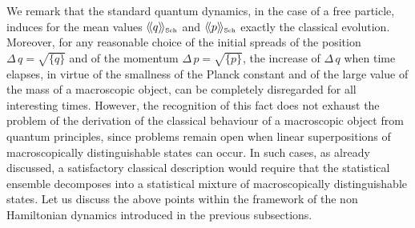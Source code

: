 \documentclass[10pt,a4paper]{article}
\newcommand{\llangle}{\langle\!\langle}
\newcommand{\rrangle}{\rangle\!\rangle}
\begin{document}
We remark that the standard quantum dynamics, in the case of a
free particle, induces for the mean values $\llangle q
\rrangle_{\makebox{\tiny Sch}}$ and $\llangle p
\rrangle_{\makebox{\tiny Sch}}$ exactly the classical evolution.
Moreover, for any reasonable choice of the initial spreads of the
position $\Delta\, q = \sqrt{\{ q\}}$ and of the momentum
$\Delta\, p = \sqrt{\{ p\}}$, the increase of $\Delta\, q$ when
time elapses, in virtue of the smallness of the Planck constant
and of the large value of the mass of a macroscopic object, can be
completely disregarded  for all interesting times. However, the
recognition of this fact does not exhaust the problem of the
derivation of the classical behaviour of a macroscopic object from
quantum principles, since problems remain open when linear
superpositions of macroscopically distinguishable states can
occur. In such cases, as already discussed, a satisfactory
classical description would require that the statistical ensemble
decomposes into a statistical mixture of macroscopically
distinguishable states. Let us discuss the above points within the
framework of the non Hamiltonian dynamics introduced in the
previous subsections.
\end{document}
